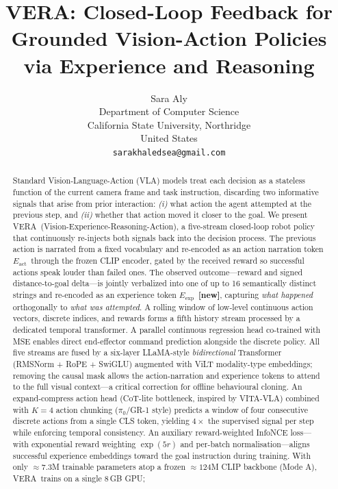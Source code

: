 \documentclass{article}
\title{VERA: Closed-Loop Feedback for Grounded Vision-Action Policies
       via Experience and Reasoning}
\author{
  Sara Aly\\
  Department of Computer Science\\
  California State University, Northridge\\
  United States\\
  \texttt{sarakhaledsea@gmail.com}
}
\newcommand{\modelname}{\textsc{VERA}\xspace}
\newcommand{\Lact}{$E_{\mathrm{act}}$\xspace}
\newcommand{\Lexp}{$E_{\mathrm{exp}}$\xspace}
\newcommand{\NEW}{\textcolor{NewOrange}{\textbf{[new]}}\xspace}
\begin{document}
\maketitle

\begin{abstract}
Standard Vision-Language-Action (VLA) models treat each decision as a
stateless function of the current camera frame and task instruction,
discarding two informative signals that arise from prior interaction:
\emph{(i)} what action the agent attempted at the previous step, and
\emph{(ii)} whether that action moved it closer to the goal.
We present \modelname\ (Vision-Experience-Reasoning-Action), a
five-stream closed-loop robot policy that continuously re-injects both
signals back into the decision process.
The previous action is narrated from a fixed vocabulary and
re-encoded as an action narration token \Lact\ through the frozen CLIP
encoder, gated by the received reward so successful actions speak
louder than failed ones.
The observed outcome---reward and signed distance-to-goal delta---is
jointly verbalized into one of up to 16 semantically distinct strings
and re-encoded as an experience token \Lexp\ \NEW, capturing
\emph{what happened} orthogonally to \emph{what was attempted}.
A rolling window of low-level continuous action vectors, discrete
indices, and rewards forms a fifth history stream processed by a
dedicated temporal transformer.
A parallel continuous regression head co-trained with MSE enables
direct end-effector command prediction alongside the discrete policy.
All five streams are fused by a six-layer LLaMA-style
\emph{bidirectional} Transformer (RMSNorm + RoPE + SwiGLU) augmented
with ViLT modality-type embeddings; removing the causal mask allows the
action-narration and experience tokens to attend to the full visual
context---a critical correction for offline behavioural cloning.
An expand-compress action head (CoT-lite bottleneck, inspired by
VITA-VLA) combined with $K{=}4$ action chunking ($\pi_0$/GR-1 style)
predicts a window of four consecutive discrete actions from a single CLS
token, yielding $4{\times}$ the supervised signal per step while
enforcing temporal consistency.
An auxiliary reward-weighted InfoNCE loss---with exponential reward
weighting $\exp(5r)$ and per-batch normalisation---aligns successful
experience embeddings toward the goal instruction during training.
With only $\approx\!7.3$M trainable parameters atop a frozen
$\approx\!124$M CLIP backbone (Mode A), \modelname\ trains on a single 8\,GB GPU;

\end{abstract}
\end{document}
